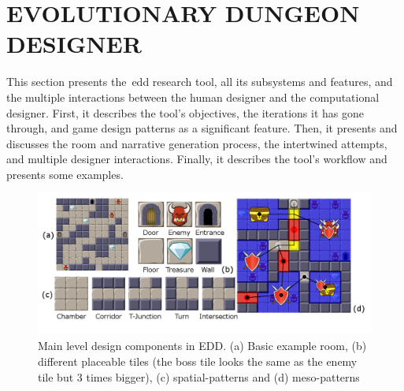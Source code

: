 \section[EVOLUTIONARY DUNGEON DESIGNER]{EVOLUTIONARY DUNGEON \\DESIGNER}

This section presents the~\acrfull{edd} research tool, all its subsystems and features, and the multiple interactions between the human designer and the computational designer. First, it describes the tool's objectives, the iterations it has gone through, and game design patterns as a significant feature. Then, it presents and discusses the room and narrative generation process, the intertwined attempts, and multiple designer interactions. Finally, it describes the tool's workflow and presents some examples.


\begin{figure}[!h]
\centerline{\includegraphics[width=\textwidth]{figures/EDD-figs/map-figure.png}}
\caption{Main level design components in EDD. (a) Basic example room, (b) different placeable tiles (the boss tile looks the same as the enemy tile but 3 times bigger), (c) spatial-patterns and (d) meso-patterns} \label{fig:tilesPats}
\end{figure}

